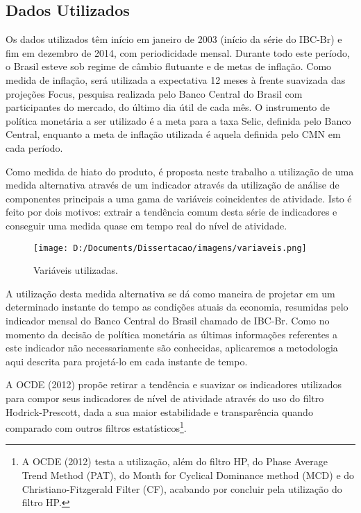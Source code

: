 \documentclass[
	article,			%
	11pt,				%
	oneside,			%
	a4paper,			%
	english,			%
	brazil,				%
	]{abntex2}
\begin{document}
	
	
	\subsection{Dados Utilizados}
	Os dados utilizados têm início em janeiro de 2003 (início da série do IBC-Br) e fim em dezembro de 2014, com periodicidade mensal. Durante todo este período, o Brasil esteve sob regime de câmbio flutuante e de metas de inflação. Como medida de inflação, será utilizada a expectativa 12 meses à frente suavizada das projeções Focus, pesquisa realizada pelo Banco Central do Brasil com participantes do mercado, do último dia útil de cada mês. O instrumento de política monetária a ser utilizado é a meta para a taxa Selic, definida pelo Banco Central, enquanto a meta de inflação utilizada é aquela definida pelo CMN em cada período.
	
	Como medida de hiato do produto, é proposta neste trabalho a utilização de uma medida alternativa através de um indicador através da utilização de análise de componentes principais a uma gama de variáveis coincidentes de atividade. Isto é feito por dois motivos: extrair a tendência comum desta série de indicadores e conseguir uma medida quase em tempo real do nível de atividade.
	
	\hfill \break
	\hfill \break
	\hfill \break
	\hfill \break
	\hfill \break
	\hfill \break
	\hfill \break
	\hfill \break
	\hfill \break
	\hfill \break
	\hfill \break
	\hfill \break
	\hfill \break
	\hfill \break
	\hfill \break
	\hfill \break
	\hfill \break
	\hfill \break
	\hfill \break
	\hfill \break
	\hfill \break
	
	\begin{figure}[!h]
	\texttt{[image: D:/Documents/Dissertacao/imagens/variaveis.png]}
	\caption{Variáveis utilizadas.}
	\label{fig:variaveis}
	\end{figure}
	
	A utilização desta medida alternativa se dá como maneira de projetar em um determinado instante do tempo as condições atuais da economia, resumidas pelo indicador mensal do Banco Central do Brasil chamado de IBC-Br. Como no momento da decisão de política monetária as últimas informações referentes a este indicador não necessariamente são conhecidas, aplicaremos a metodologia aqui descrita para projetá-lo em cada instante de tempo.
	
	A OCDE (2012) propõe retirar a tendência e suavizar os indicadores utilizados para compor seus indicadores de nível de atividade através do uso do filtro Hodrick-Prescott, dada a sua maior estabilidade e transparência quando comparado com outros filtros estatísticos\footnote{A OCDE (2012) testa a utilização, além do filtro HP, do Phase Average Trend Method (PAT), do Month for Cyclical Dominance method (MCD) e do Christiano-Fitzgerald Filter (CF), acabando por concluir pela utilização do filtro HP.}.
	
\end{document}
